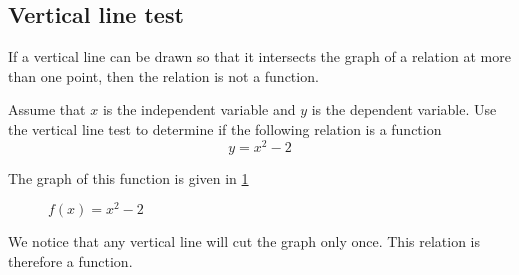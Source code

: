 \subsection{Vertical line test}
If a vertical line can be drawn so that it intersects the graph of a relation at more
than one point, then the relation is not a function.

\begin{myexample}
Assume that $x$ is the independent variable and $y$ is the dependent variable. Use the vertical
line test to determine if the following relation is a function
\[
	y = x^2-2
\]
{}
\end{myexample}
\begin{myProof}
	The graph of this function is given in \cref{fig:verticallinetest}
	\begin{figure}[!ht]
		\centering
		\caption{$f(x)=x^2-2$}
		\label{fig:verticallinetest}
	\end{figure}
	We notice that any vertical line will cut the graph only once. This relation is therefore a function.
\end{myProof} 
